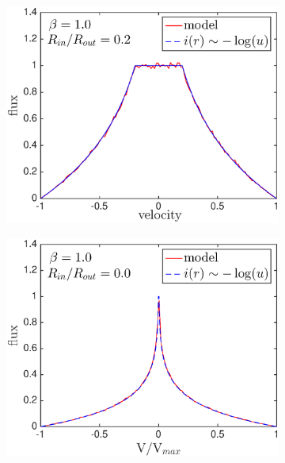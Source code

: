 \begin{figure}
\begin{subfigure}{0.5\textwidth}
\centering
\includegraphics[trim =0 25 45 15,clip=true,scale=0.4]{chapters/chapter4/images/params/A/b1_r0_2}
\end{subfigure}
\hspace{4mm}
\begin{subfigure}{0.5\textwidth}
\centering
\includegraphics[trim =72 27 45 15,clip=true,scale=0.4]{chapters/chapter4/images/params/A/b1_r0} 
\end{subfigure} \\[1.0ex]


\end{figure}
